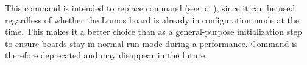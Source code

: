 \documentclass[letterpaper,twoside,onecolumn,openright,final]{memoir}
\begin{document}
This command is intended to replace command  (see p.~\pageref{cmd:xprivold}), since it can be
used regardless of whether the Lumos board is already in configuration mode at the time.  This makes
it a better choice than  as a general-purpose initialization step to ensure boards stay in
normal run mode during a performance.  Command  is therefore deprecated and may disappear
in the future.

%
\end{document}
